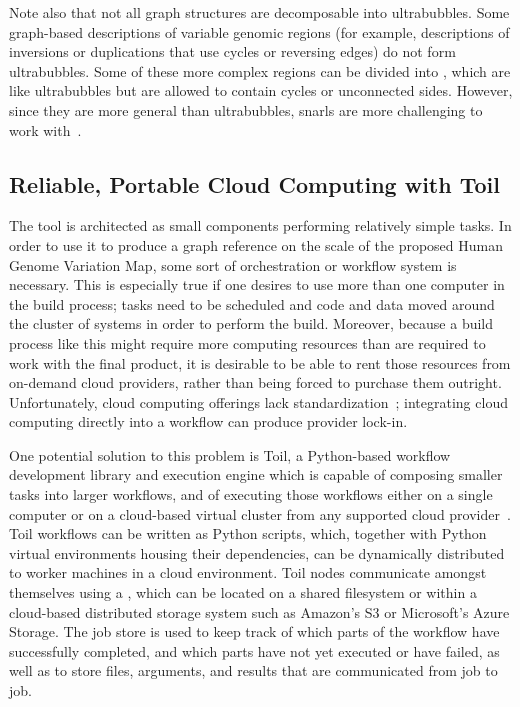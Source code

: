 Note also that not all graph structures are decomposable into ultrabubbles. Some graph-based descriptions of variable genomic regions (for example, descriptions of inversions or duplications that use cycles or reversing edges) do not form ultrabubbles. Some of these more complex regions can be divided into , which are like ultrabubbles but are allowed to contain cycles or unconnected sides. However, since they are more general than ultrabubbles, snarls are more challenging to work with~\cite{paten2017superbubbles}.

\subsection{Reliable, Portable Cloud Computing with Toil}


The \vg tool is architected as small components performing relatively simple tasks. In order to use it to produce a graph reference on the scale of the proposed Human Genome Variation Map, some sort of orchestration or workflow system is necessary. This is especially true if one desires to use more than one computer in the build process; tasks need to be scheduled and code and data moved around the cluster of systems in order to perform the build. Moreover, because a build process like this might require more computing resources than are required to work with the final product, it is desirable to be able to rent those resources from on-demand cloud providers, rather than being forced to purchase them outright. Unfortunately, cloud computing offerings lack standardization~\cite{ortiz2011problem}; integrating cloud computing directly into a workflow can produce provider lock-in.

One potential solution to this problem is Toil, a Python-based workflow development library and execution engine which is capable of composing smaller tasks into larger workflows, and of executing those workflows either on a single computer or on a cloud-based virtual cluster from any supported cloud provider~\cite{vivian2017toil}. Toil workflows can be written as Python scripts, which, together with Python virtual environments housing their dependencies, can be dynamically distributed to worker machines in a cloud environment. Toil nodes communicate amongst themselves using a , which can be located on a shared filesystem or within a cloud-based distributed storage system such as Amazon's S3 or Microsoft's Azure Storage. The job store is used to keep track of which parts of the workflow have successfully completed, and which parts have not yet executed or have failed, as well as to store files, arguments, and results that are communicated from job to job.

